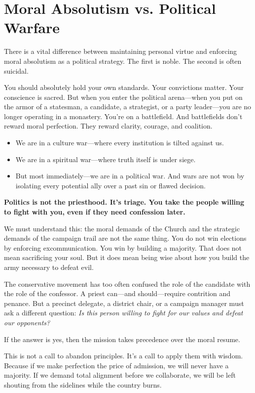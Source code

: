 \section{Moral Absolutism vs. Political Warfare}

There is a vital difference between maintaining personal virtue and enforcing moral absolutism as a political strategy. The first is noble. The second is often suicidal.

You should absolutely hold your own standards. Your convictions matter. Your conscience is sacred. But when you enter the political arena—when you put on the armor of a statesman, a candidate, a strategist, or a party leader—you are no longer operating in a monastery. You’re on a battlefield. And battlefields don’t reward moral perfection. They reward clarity, courage, and coalition.

\begin{itemize}
    \item We are in a culture war—where every institution is tilted against us.
    \item We are in a spiritual war—where truth itself is under siege.
    \item But most immediately—we are in a political war. And wars are not won by isolating every potential ally over a past sin or flawed decision.
\end{itemize}

\textbf{Politics is not the priesthood. It’s triage. You take the people willing to fight with you, even if they need confession later.}

We must understand this: the moral demands of the Church and the strategic demands of the campaign trail are not the same thing. You do not win elections by enforcing excommunication. You win by building a majority. That does not mean sacrificing your soul. But it does mean being wise about how you build the army necessary to defeat evil.

The conservative movement has too often confused the role of the candidate with the role of the confessor. A priest can—and should—require contrition and penance. But a precinct delegate, a district chair, or a campaign manager must ask a different question: \textit{Is this person willing to fight for our values and defeat our opponents?}

If the answer is yes, then the mission takes precedence over the moral resume.

This is not a call to abandon principles. It’s a call to apply them with wisdom. Because if we make perfection the price of admission, we will never have a majority. If we demand total alignment before we collaborate, we will be left shouting from the sidelines while the country burns.

